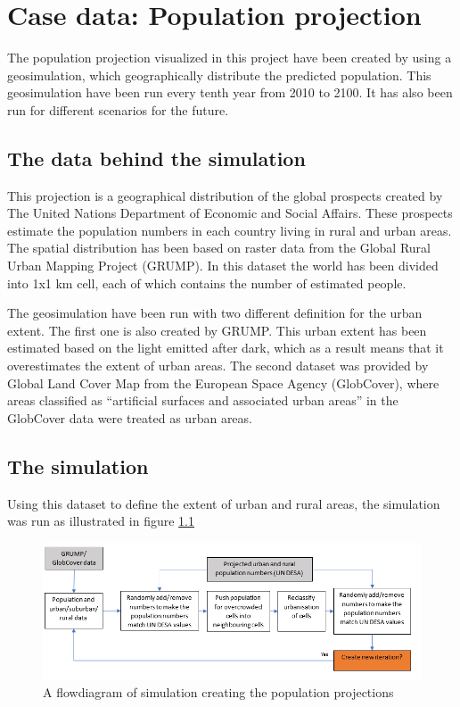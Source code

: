 \chapter{Case data: Population projection}
The population projection visualized in this project have been created by \citet{Kessler} using a geosimulation, which geographically distribute the predicted population. This geosimulation have been run every tenth year from 2010 to 2100. It has also been run for different scenarios for the future.

\section{The data behind the simulation}
This projection is a geographical distribution of the global prospects created by The United Nations Department of Economic and Social Affairs. These prospects estimate the population numbers in each country living in rural and urban areas. The spatial distribution has been based on raster data from the Global Rural Urban Mapping Project (GRUMP). In this dataset the world has been divided into 1x1 km cell, each of which contains the number of estimated people. \citep{Kessler}

The geosimulation have been run with two different definition for the urban extent. The first one is also created by GRUMP. This urban extent has been estimated based on the light emitted after dark, which as a result means that it overestimates the extent of urban areas. \citep{Kessler}
The second dataset was provided by Global Land Cover Map from the European Space Agency (GlobCover), where areas classified as “artificial surfaces and associated urban areas” in the GlobCover data were treated as urban areas. 

\section{The simulation}
Using this dataset to define the extent of urban and rural areas, the simulation was run as illustrated in figure \ref{CreatingData}

\begin{figure} [H]
	\centering
	\includegraphics[width=.8\textwidth]{Pictures/CreatingData}
	\caption{A flowdiagram of simulation creating the population projections}
	\label{CreatingData}
\end{figure}

